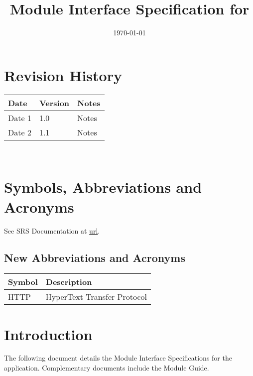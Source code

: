 \documentclass[12pt, titlepage]{article}
\begin{document}
\title{Module Interface Specification for \progname{}}

\author{\authname}

\date{\today}

\maketitle


\section{Revision History}

\begin{tabularx}{\textwidth}{p{3cm}p{2cm}X}
\toprule {\bf Date} & {\bf Version} & {\bf Notes}\\
\midrule
Date 1 & 1.0 & Notes\\
Date 2 & 1.1 & Notes\\
\bottomrule
\end{tabularx}

~\newpage

\section{Symbols, Abbreviations and Acronyms}

See SRS Documentation at \href{https://github.com/RezaJodeiri/CXR-Capstone/blob/main/docs/SRS/SRS.pdf}{url}.
\subsection{New Abbreviations and Acronyms}
\renewcommand{\arraystretch}{1.3}
\noindent \begin{tabular}{l l} 
  \toprule		
  \textbf{Symbol} & \textbf{Description}\\
  \midrule 
  HTTP & HyperText Transfer Protocol\\
  \bottomrule
\end{tabular}

\newpage

\tableofcontents

\newpage


\section{Introduction}

The following document details the Module Interface Specifications for the
 application. Complementary documents include the Module Guide.
\end{document}
